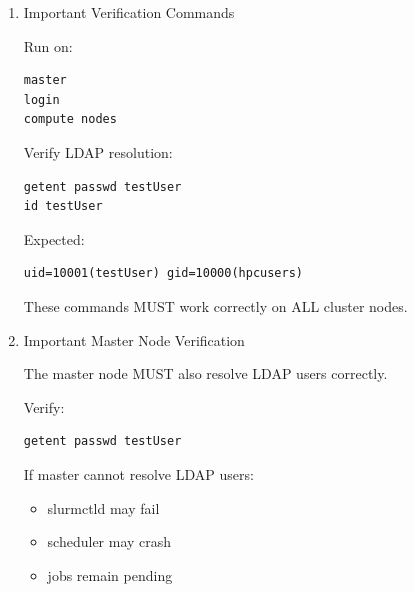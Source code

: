 \documentclass[11pt]{article}
\begin{document}
\begin{enumerate}
then:

\begin{itemize}
\item Slurm credential generation fails
\item scheduler may crash
\item jobs cannot launch
\end{itemize}

Common error:

\begin{verbatim}
_fill_cred_gids: getpwuid failed for uid=10001
\end{verbatim}

Meaning:

\begin{verbatim}
Slurm cannot resolve LDAP user identity correctly.
\end{verbatim}
\item Important Verification Commands
\label{sec:org81661f3}

Run on:

\begin{verbatim}
master
login
compute nodes
\end{verbatim}

Verify LDAP resolution:

\begin{verbatim}
getent passwd testUser
id testUser
\end{verbatim}

Expected:

\begin{verbatim}
uid=10001(testUser) gid=10000(hpcusers)
\end{verbatim}

These commands MUST work correctly on ALL cluster nodes.
\item Important Master Node Verification
\label{sec:orge18a5da}

The master node MUST also resolve LDAP users correctly.

Verify:

\begin{verbatim}
getent passwd testUser
\end{verbatim}

If master cannot resolve LDAP users:

\begin{itemize}
\item slurmctld may fail
\item scheduler may crash
\item jobs remain pending
\end{itemize}


\end{enumerate}
\end{document}
